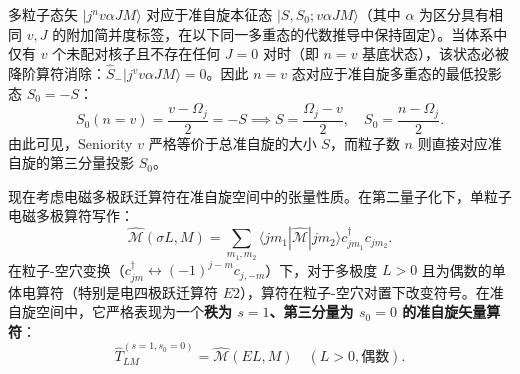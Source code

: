 多粒子态矢 $|j^n v \alpha J M\rangle$ 对应于准自旋本征态 $|S, S_0; v \alpha J M\rangle$（其中 $\alpha$ 为区分具有相同 $v, J$ 的附加简并度标签，在以下同一多重态的代数推导中保持固定）。当体系中仅有 $v$ 个未配对核子且不存在任何 $J=0$ 对时（即 $n = v$ 基底状态），该状态必被降阶算符消除：$\hat{S}_- |j^v v \alpha J M\rangle = 0$。因此 $n=v$ 态对应于准自旋多重态的最低投影态 $S_0 = -S$：
\begin{equation}\label{eq:4-6-quasispin-quantum-number}
S_0(n=v) = \frac{v - \Omega_j}{2} = -S \implies S = \frac{\Omega_j - v}{2}, \quad S_0 = \frac{n - \Omega_j}{2}.
\end{equation}
由此可见，Seniority $v$ 严格等价于总准自旋的大小 $S$，而粒子数 $n$ 则直接对应准自旋的第三分量投影 $S_0$。

现在考虑电磁多极跃迁算符在准自旋空间中的张量性质。在第二量子化下，单粒子电磁多极算符写作：
\begin{equation}\label{eq:4-6-EM-operator-second-quant}
\hat{\mathcal{M}}(\sigma L, M) = \sum_{m_1, m_2} \langle j m_1 | \hat{\mathcal{M}} | j m_2 \rangle c_{jm_1}^\dagger c_{jm_2}.
\end{equation}
在粒子-空穴变换（$c_{jm}^\dagger \leftrightarrow (-1)^{j-m} c_{j,-m}$）下，对于多极度 $L > 0$ 且为偶数的单体电算符（特别是电四极跃迁算符 $E2$），算符在粒子-空穴对置下改变符号。在准自旋空间中，它严格表现为一个\textbf{秩为 $s=1$、第三分量为 $s_0=0$ 的准自旋矢量算符}：
\begin{equation}\label{eq:4-6-operator-quasispin-tensor}
\hat{T}^{(s=1, s_0=0)}_{LM} = \hat{\mathcal{M}}(EL, M) \quad (L > 0, \text{偶数}).
\end{equation}


